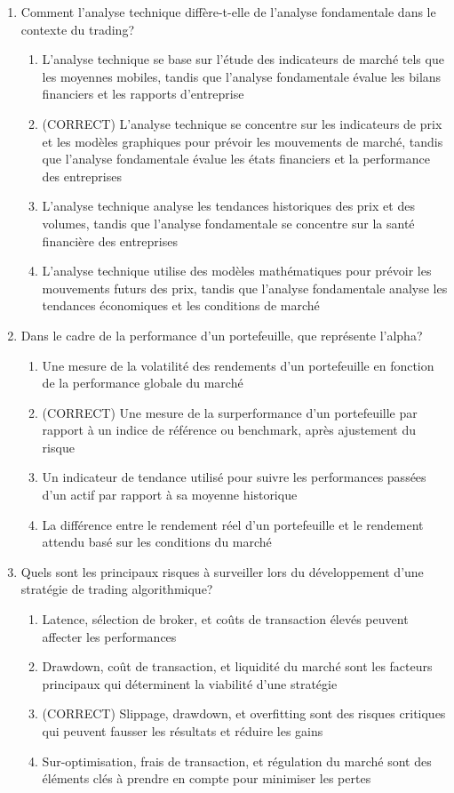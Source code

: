 \documentclass[a4paper,12pt]{article}
\begin{document}
\begin{enumerate}
    \item Comment l'analyse technique diffère-t-elle de l'analyse fondamentale dans le contexte du trading?
    \begin{enumerate}[label=(\Alph*)]
        \item L'analyse technique se base sur l'étude des indicateurs de marché tels que les moyennes mobiles, tandis que l'analyse fondamentale évalue les bilans financiers et les rapports d'entreprise
        \item (CORRECT) L'analyse technique se concentre sur les indicateurs de prix et les modèles graphiques pour prévoir les mouvements de marché, tandis que l'analyse fondamentale évalue les états financiers et la performance des entreprises
        \item L'analyse technique analyse les tendances historiques des prix et des volumes, tandis que l'analyse fondamentale se concentre sur la santé financière des entreprises
        \item L'analyse technique utilise des modèles mathématiques pour prévoir les mouvements futurs des prix, tandis que l'analyse fondamentale analyse les tendances économiques et les conditions de marché
    \end{enumerate}

    \item Dans le cadre de la performance d'un portefeuille, que représente l'alpha?
    \begin{enumerate}[label=(\Alph*)]
        \item Une mesure de la volatilité des rendements d'un portefeuille en fonction de la performance globale du marché
        \item (CORRECT) Une mesure de la surperformance d'un portefeuille par rapport à un indice de référence ou benchmark, après ajustement du risque
        \item Un indicateur de tendance utilisé pour suivre les performances passées d'un actif par rapport à sa moyenne historique
        \item La différence entre le rendement réel d'un portefeuille et le rendement attendu basé sur les conditions du marché
    \end{enumerate}

    \item Quels sont les principaux risques à surveiller lors du développement d'une stratégie de trading algorithmique?
    \begin{enumerate}[label=(\Alph*)]
        \item Latence, sélection de broker, et coûts de transaction élevés peuvent affecter les performances
        \item Drawdown, coût de transaction, et liquidité du marché sont les facteurs principaux qui déterminent la viabilité d'une stratégie
        \item (CORRECT) Slippage, drawdown, et overfitting sont des risques critiques qui peuvent fausser les résultats et réduire les gains
        \item Sur-optimisation, frais de transaction, et régulation du marché sont des éléments clés à prendre en compte pour minimiser les pertes
    \end{enumerate}


\end{enumerate}
\end{document}
